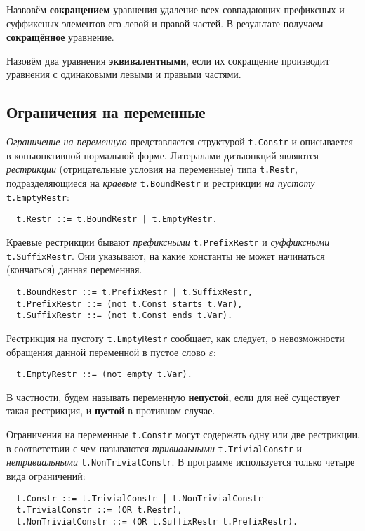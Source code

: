 \documentclass[12pt]{article}
\begin{document}
Назвовём \textbf{сокращением} уравнения удаление всех совпадающих префиксных
и суффиксных элементов его левой и правой частей. В результате получаем
\textbf{сокращённое} уравнение.

Назовём два уравнения \textbf{эквивалентными}, если их сокращение производит
уравнения с одинаковыми левыми и правыми частями.

\subsection{Ограничения на переменные}

\textit{Ограничение на переменную} представляется структурой \texttt{t.Constr}
и описывается в конъюнктивной нормальной форме. Литералами дизъюнкций являются
\textit{рестрикции} (отрицательные условия на переменные) типа \texttt{t.Restr},
подразделяющиеся на \textit{краевые} \texttt{t.BoundRestr} и рестрикции
\textit{на пустоту} \texttt{t.EmptyRestr}:
\begin{Verbatim}
  t.Restr ::= t.BoundRestr | t.EmptyRestr.
\end{Verbatim}

Краевые рестрикции бывают \textit{префиксными} \texttt{t.PrefixRestr} и
\textit{суффиксными} \texttt{t.SuffixRestr}. Они указывают, на какие константы
не может начинаться (кончаться) данная переменная.
\begin{Verbatim}
  t.BoundRestr ::= t.PrefixRestr | t.SuffixRestr,
  t.PrefixRestr ::= (not t.Const starts t.Var),
  t.SuffixRestr ::= (not t.Const ends t.Var).
\end{Verbatim}

Рестрикция на пустоту \texttt{t.EmptyRestr} сообщает, как следует, о
невозможности обращения данной переменной в пустое слово $\varepsilon$:
\begin{Verbatim}
  t.EmptyRestr ::= (not empty t.Var).
\end{Verbatim}

В частности, будем называть переменную \textbf{непустой}, если для неё
существует такая рестрикция, и \textbf{пустой} в противном случае.

Ограничения на переменные \texttt{t.Constr} могут содержать одну или две
рестрикции, в соответствии с чем называются \textit{тривиальными}
\texttt{t.TrivialConstr} и \textit{нетривиальными} \texttt{t.NonTrivialConstr}.
В программе используется только четыре вида ограничений:
\begin{Verbatim}
  t.Constr ::= t.TrivialConstr | t.NonTrivialConstr
  t.TrivialConstr ::= (OR t.Restr),
  t.NonTrivialConstr ::= (OR t.SuffixRestr t.PrefixRestr).
\end{Verbatim}
\end{document}
